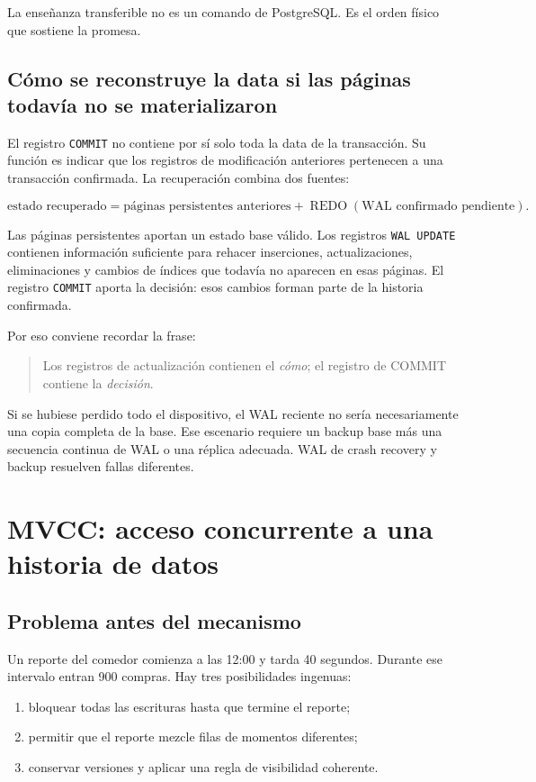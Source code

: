 \documentclass[variant=apuntes,cover=institutional,mode=screen]{ua-engineering-v6-article}
\begin{document}
La enseñanza transferible no es un comando de PostgreSQL. Es el orden físico que sostiene la promesa.

\subsection{Cómo se reconstruye la data si las páginas todavía no se materializaron}

El registro \texttt{COMMIT} no contiene por sí solo toda la data de la transacción. Su función es indicar que los registros de modificación anteriores pertenecen a una transacción confirmada. La recuperación combina dos fuentes:

\[
\text{estado recuperado}
=
\text{páginas persistentes anteriores}
+
\operatorname{REDO}(\text{WAL confirmado pendiente}).
\]

Las páginas persistentes aportan un estado base válido. Los registros \texttt{WAL UPDATE} contienen información suficiente para rehacer inserciones, actualizaciones, eliminaciones y cambios de índices que todavía no aparecen en esas páginas. El registro \texttt{COMMIT} aporta la decisión: esos cambios forman parte de la historia confirmada.

Por eso conviene recordar la frase:

\begin{quote}
Los registros de actualización contienen el \emph{cómo}; el registro de COMMIT contiene la \emph{decisión}.
\end{quote}

Si se hubiese perdido todo el dispositivo, el WAL reciente no sería necesariamente una copia completa de la base. Ese escenario requiere un backup base más una secuencia continua de WAL o una réplica adecuada. WAL de crash recovery y backup resuelven fallas diferentes.

\section{MVCC: acceso concurrente a una historia de datos}

\subsection{Problema antes del mecanismo}

Un reporte del comedor comienza a las 12:00 y tarda 40 segundos. Durante ese intervalo entran 900 compras. Hay tres posibilidades ingenuas:

\begin{enumerate}
\item bloquear todas las escrituras hasta que termine el reporte;
\item permitir que el reporte mezcle filas de momentos diferentes;
\item conservar versiones y aplicar una regla de visibilidad coherente.
\end{enumerate}
\end{document}
